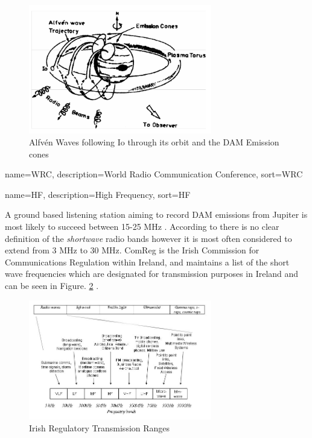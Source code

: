 \documentclass[runningheads,a4paper]{llncs}
\begin{document}
%
\begin{figure}[here]
\centering
\includegraphics[width=8cm]{images/04}
\caption{Alfv\'en Waves following Io through its orbit and the DAM Emission cones \citep{bose08}}
\label{fig:io_plasma_torus}
\end{figure}
%

%
%
%

%
{
  name={WRC},
  description={World Radio Communication Conference},
  sort=WRC
}
%

%
{
  name={HF},
  description={High Frequency},
  sort=HF
}
%

A ground based listening station aiming to record \gls{DAM} emissions from Jupiter is most likely to succeed between 15-25 MHz \citep{wilkinson94}. According to \cite{arrl-00} there is no clear definition of the \textit{shortwave} radio bands however it is most often considered to extend from 3 MHz to 30 MHz. ComReg is the Irish Commission for Communications Regulation within Ireland, and maintains a list of the short wave frequencies which are designated for transmission purposes in Ireland and can be seen in Figure. \ref{fig:irish_electromagnetic_transmission_ranges} \citep{comreg14}.

%
\begin{figure}[here]
\centering
\includegraphics[width=8cm]{images/06}
\caption{Irish Regulatory Transmission Ranges \citep{comreg14}}
\label{fig:irish_electromagnetic_transmission_ranges}
\end{figure}
%
\end{document}
